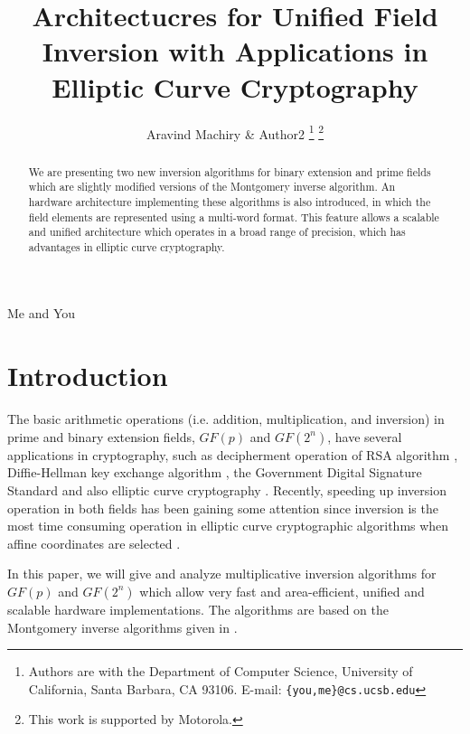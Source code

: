 \documentclass[twocolumn]{IEEEtran}
\begin{document}
\title{Architectucres for Unified Field Inversion with Applications 
in Elliptic Curve Cryptography}


\author{Aravind Machiry \& Author2
\thanks{Authors are with the
Department of Computer Science,
University of California, Santa Barbara, CA 93106.
E-mail: \texttt{\{you,me\}@cs.ucsb.edu}}
\thanks{This work is supported by Motorola.}
}

{Me and You}

\maketitle

\begin{abstract}
We are presenting two new inversion algorithms for binary extension
and prime fields which are slightly modified versions of the
Montgomery inverse algorithm. An hardware architecture implementing
these algorithms is also introduced, in which the field elements
are represented using a multi-word format. This feature allows a
scalable and unified architecture which operates in a broad range 
of precision, which has advantages in elliptic curve cryptography.
\end{abstract}

\section {Introduction}

The basic arithmetic operations (i.e. addition, multiplication, and 
inversion) in prime and binary extension fields, $GF(p)$ and $GF(2^n)$, 
have several applications in cryptography, such as decipherment 
operation of RSA algorithm \cite{QC82:Fast}, Diffie-Hellman key exchange 
algorithm \cite{DH76:New}, the Government Digital Signature Standard 
\cite{NIST91:DSS} and also elliptic curve cryptography 
\cite{K87:Elliptic,M93:Elliptic}. Recently, speeding up inversion operation
in both fields has been gaining some attention since inversion is the
most time consuming operation in elliptic curve cryptographic algorithms 
when affine coordinates are selected \cite{K95:The,SOOS95:Fast,%
K99:Fast,SK00:The,H01:Efficient}.

In this paper, we will give and analyze multiplicative inversion algorithms
for $GF(p)$ and $GF(2^n)$ which allow very fast and area-efficient, unified
and scalable hardware
implementations. The algorithms are based on the Montgomery inverse algorithms 
given in \cite{K95:The}. 
\end{document}
